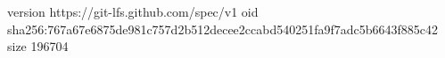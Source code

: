 version https://git-lfs.github.com/spec/v1
oid sha256:767a67e6875de981c757d2b512decee2ccabd540251fa9f7adc5b6643f885c42
size 196704
